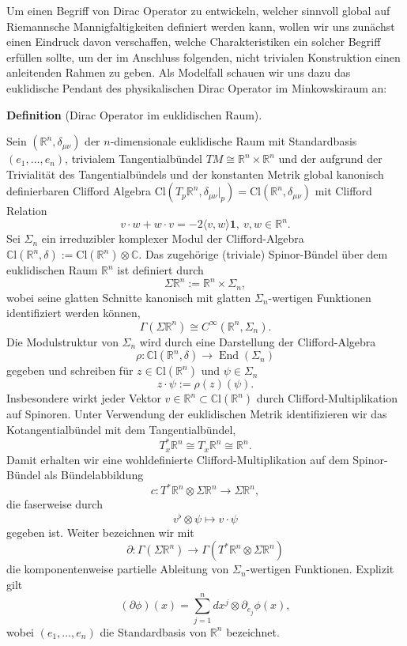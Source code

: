 \documentclass[10pt, letterpaper]{article}
\newcommand{\R}{\mathbb{R}}
\newcommand{\C}{\mathbb{C}}
\newcommand{\Cl}{\mathrm{Cl}}
\newcommand{\CustomHeading}[3]{%
  \par\medskip\noindent%
  \textbf{#1 #2} \textnormal{(#3)}.\enskip%
}
\newenvironment{DEF}[2]{\CustomHeading{Definition}{#1}{#2}}{}
\begin{document}
Um einen Begriff von Dirac Operator zu entwickeln, welcher sinnvoll global auf Riemannsche Mannigfaltigkeiten definiert werden kann, wollen wir uns zunächst einen Eindruck davon verschaffen, welche Charakteristiken ein solcher Begriff erfüllen sollte, um der im Anschluss folgenden, nicht trivialen Konstruktion einen anleitenden Rahmen zu geben. Als Modelfall schauen wir uns dazu das euklidische Pendant des physikalischen Dirac Operator im Minkowskiraum an:



\begin{DEF}{}{Dirac Operator im euklidischen Raum}
  Sein $(\R^n,\delta_{\mu\nu})$ der $n$-dimensionale euklidische Raum mit Standardbasis $(e_1,…,e_n)$, trivialem Tangentialbündel $TM\cong \R^{n}\times \R^n$ und der aufgrund der Trivialität des Tangentialbündels und der konstanten Metrik global kanonisch definierbaren Clifford Algebra $\Cl(T_p\R^n,\delta_{\mu\nu}|_p)=\Cl(\R^n,\delta_{\mu\nu})$ mit Clifford Relation 
  $$v\cdot w + w \cdot v =-2 \langle v,w \rangle \mathbf{1},\ v,w\in\R^n.$$
  Sei $\Sigma_n$ ein irreduzibler komplexer Modul der Clifford-Algebra
  $\C\mathrm{l}\left(\mathbb{R}^n, \delta\right):=\Cl(\R^n)\otimes \C$.
  Das zugehörige (triviale) Spinor-Bündel über dem euklidischen Raum $\mathbb{R}^n$ ist definiert durch
  $$
  \Sigma \mathbb{R}^n:=\mathbb{R}^n \times \Sigma_n,
  $$
  wobei seine glatten Schnitte kanonisch mit glatten $\Sigma_n$-wertigen Funktionen identifiziert werden können,
  $$
  \Gamma\left(\Sigma \mathbb{R}^n\right) \cong C^{\infty}\left(\mathbb{R}^n, \Sigma_n\right) .
  $$
  Die Modulstruktur von $\Sigma_n$ wird durch eine Darstellung der Clifford-Algebra
  $$
  \rho: \C\mathrm{l}\left(\mathbb{R}^n, \delta\right) \longrightarrow \operatorname{End}\left(\Sigma_n\right)
  $$
  gegeben und schreiben für $z \in \C\mathrm{l}\left(\mathbb{R}^n\right)$ und $\psi \in \Sigma_n$
  $$
  z \cdot \psi:=\rho(z)(\psi) .
  $$
  Insbesondere wirkt jeder Vektor $v \in \mathbb{R}^n \subset \C\mathrm{l}\left(\mathbb{R}^n\right)$ durch Clifford-Multiplikation auf Spinoren.
  Unter Verwendung der euklidischen Metrik identifizieren wir das Kotangentialbündel mit dem Tangentialbündel,
  $$
  T_x^* \mathbb{R}^n \cong T_x \mathbb{R}^n \cong \mathbb{R}^n .
  $$
  Damit erhalten wir eine wohldefinierte Clifford-Multiplikation auf dem Spinor-Bündel als Bündelabbildung
  $$
  c: T^* \mathbb{R}^n \otimes \Sigma \mathbb{R}^n \longrightarrow \Sigma \mathbb{R}^n,
  $$
  die faserweise durch
  $$
  v^\flat \otimes \psi \mapsto v \cdot \psi
  $$
  gegeben ist. Weiter bezeichnen wir mit
  $$
  \partial: \Gamma\left(\Sigma \mathbb{R}^n\right) \longrightarrow \Gamma\left(T^* \mathbb{R}^n \otimes \Sigma \mathbb{R}^n\right)
  $$
  die komponentenweise partielle Ableitung von $\Sigma_n$-wertigen Funktionen. Explizit gilt
  $$
  (\partial \phi)(x)=\sum_{j=1}^n d x^j \otimes \partial_{e_j} \phi(x),
  $$
  wobei $\left(e_1, \ldots, e_n\right)$ die Standardbasis von $\mathbb{R}^n$ bezeichnet.
  

\end{DEF}
\end{document}
